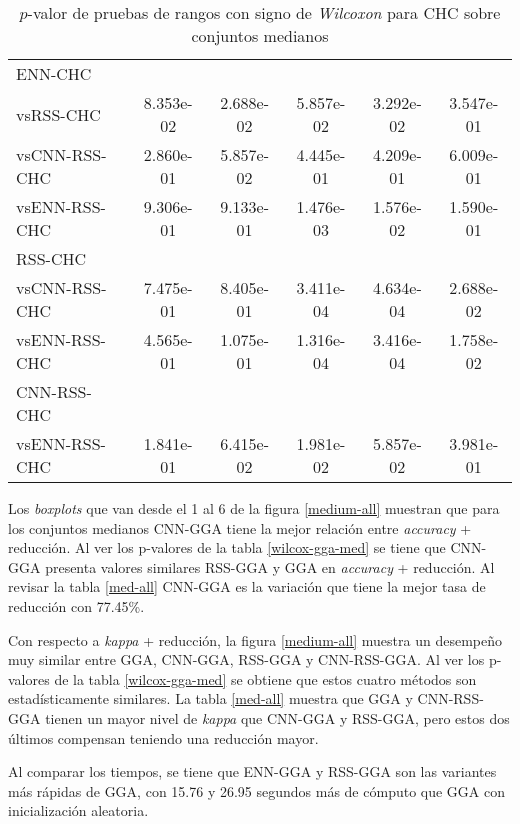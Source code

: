 \begin{table}[h!]
\begin{adjustbox}{max width =\textwidth}
\begin{tabular}{l c c c c c}
\hline

ENN-CHC\\
vsRSS-CHC & 8.353e-02 & 2.688e-02 & 5.857e-02 & 3.292e-02 & 3.547e-01 \\
vsCNN-RSS-CHC & 2.860e-01 & 5.857e-02 & 4.445e-01 & 4.209e-01 & 6.009e-01 \\  
vsENN-RSS-CHC & 9.306e-01 & 9.133e-01 & 1.476e-03 & 1.576e-02 & 1.590e-01 \\ 

\hline

RSS-CHC\\
vsCNN-RSS-CHC & 7.475e-01 & 8.405e-01 & 3.411e-04 & 4.634e-04 & 2.688e-02 \\
vsENN-RSS-CHC & 4.565e-01 & 1.075e-01 & 1.316e-04 & 3.416e-04 & 1.758e-02 \\

\hline

CNN-RSS-CHC\\
vsENN-RSS-CHC  & 1.841e-01 & 6.415e-02 & 1.981e-02 & 5.857e-02 & 3.981e-01 \\

\hline


\end{tabular}
\end{adjustbox}
\caption[Pruebas de \emph{Wilcoxon} entre CHC y variaciones para conjuntos medianos]{$p$-valor de pruebas de rangos con signo de \emph{Wilcoxon} para CHC sobre conjuntos medianos}
\label{wilcox-CHC-med}
\end{table}


Los \emph{boxplots} que van desde el 1 al 6 de la figura \ref{medium-all} muestran que para los conjuntos medianos CNN-GGA tiene la mejor relación entre \emph{accuracy} + reducción. Al ver los p-valores de la tabla \ref{wilcox-gga-med} se tiene que CNN-GGA presenta valores similares RSS-GGA y GGA en \emph{accuracy} + reducción. Al revisar la tabla \ref{med-all} CNN-GGA es la variación que tiene la mejor tasa de reducción con 77.45\%.

Con respecto a \emph{kappa} + reducción, la figura \ref{medium-all} muestra un desempeño muy similar entre GGA, CNN-GGA, RSS-GGA y CNN-RSS-GGA. Al ver los p-valores de la tabla \ref{wilcox-gga-med} se obtiene que estos cuatro métodos son estadísticamente similares. La tabla \ref{med-all} muestra que GGA y CNN-RSS-GGA tienen un mayor nivel de \emph{kappa} que CNN-GGA y RSS-GGA, pero estos dos últimos compensan teniendo una reducción mayor.

Al comparar los tiempos, se tiene que ENN-GGA y RSS-GGA son las variantes más rápidas de GGA, con 15.76 y 26.95 segundos más de cómputo que GGA con inicialización aleatoria.

